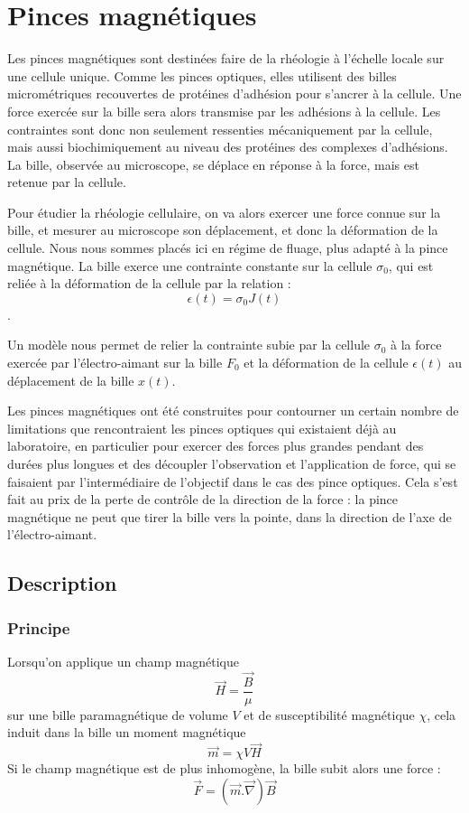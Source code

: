 \documentclass{report}
\begin{document}
\section{Pinces magnétiques}

Les pinces magnétiques sont destinées faire de la rhéologie à l'échelle locale sur une cellule unique. Comme les pinces optiques, elles utilisent des billes micrométriques recouvertes de protéines d'adhésion pour s'ancrer à la cellule. 
Une force exercée sur la bille sera alors transmise par les adhésions à la cellule.
 Les contraintes sont donc non seulement ressenties mécaniquement par la cellule, mais aussi biochimiquement au niveau des protéines des complexes d'adhésions. 
La bille, observée au microscope, se déplace en réponse à la force, mais est retenue par la cellule.

Pour étudier la rhéologie cellulaire, on va alors exercer une force connue sur la bille, et mesurer au microscope son déplacement, et donc la déformation de la cellule.
Nous nous sommes placés ici en régime de fluage, plus adapté à la pince magnétique. La bille exerce une contrainte constante sur la cellule $\sigma_0$, qui est reliée à la déformation de la cellule par la relation : 
$$\epsilon (t) = \sigma_0 J(t)$$.

Un modèle nous permet de relier la contrainte subie par la cellule $\sigma_0$ à la force exercée par l'électro-aimant sur la bille $F_0$ et la déformation de la cellule $\epsilon (t)$ au déplacement de la bille $x(t)$. 






Les pinces magnétiques ont été construites pour contourner un certain nombre de limitations que rencontraient les pinces optiques qui existaient déjà au laboratoire, en particulier pour exercer des forces plus grandes pendant des durées plus longues et des découpler l'observation et l'application de force, qui se faisaient par l'intermédiaire de l'objectif dans le cas des pince optiques. Cela s'est fait au prix de la perte de contrôle de la direction de la force : la pince magnétique ne peut que tirer la bille vers la pointe, dans la direction de l'axe de l'électro-aimant. 


	\subsection{Description}
		\subsubsection{Principe}
		Lorsqu'on applique un champ magnétique $$\vec{H} = \frac{\vec{B}}{\mu}$$ sur une bille paramagnétique de volume $V$ et de susceptibilité magnétique $\chi$, cela induit dans la bille un moment magnétique $$\vec{m} = \chi V \vec{H}$$ Si le champ magnétique est de plus inhomogène, la bille subit alors une force :$$\vec{F} = \left( \vec{m}. \vec{\nabla} \right) \vec{B}$$
	
\end{document}

